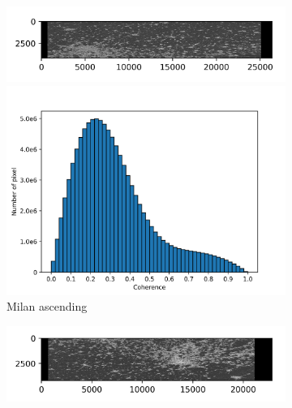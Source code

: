 \documentclass[a4paper,fleqn]{cas-sc}
\begin{document}
\begin{figure}
\begin{subfigure}{0.5\textwidth}
        \caption*{}
    \end{subfigure}%
    \hfill
    \begin{subfigure}{0.5\textwidth}
        \centering
        \begin{minipage}{0.5\textwidth}
            \centering
            \includegraphics[width=\textwidth]{figure/The coherence/coh_Milan_asc_esd1.png}
        \end{minipage}%
        \begin{minipage}{0.5\textwidth}
            \centering
            \includegraphics[width=\textwidth]{figure/The coherence/coh_Milan_asc_esd1_histogram_.png}
        \end{minipage}
        \caption{Milan ascending}
        \label{fig_6f}
    \end{subfigure}%
    \begin{subfigure}{0.5\textwidth}
        \centering
        \begin{minipage}{0.5\textwidth}
            \centering
            \includegraphics[width=\textwidth]{figure/The coherence/coh_Milan_des_esd1.png}

\end{minipage}
\end{subfigure}
\end{figure}
\end{document}
